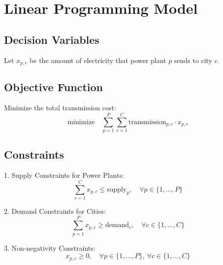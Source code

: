 \documentclass{article}
\begin{document}
\section*{Linear Programming Model}

\subsection*{Decision Variables}
Let \( x_{p,c} \) be the amount of electricity that power plant \( p \) sends to city \( c \).

\subsection*{Objective Function}
Minimize the total transmission cost:
\[
\text{minimize} \quad \sum_{p=1}^{P} \sum_{c=1}^{C} \text{transmission}_{p,c} \cdot x_{p,c}
\]

\subsection*{Constraints}
1. Supply Constraints for Power Plants:
   \[
   \sum_{c=1}^{C} x_{p,c} \leq \text{supply}_{p}, \quad \forall p \in \{1, \ldots, P\}
   \]

2. Demand Constraints for Cities:
   \[
   \sum_{p=1}^{P} x_{p,c} \geq \text{demand}_{c}, \quad \forall c \in \{1, \ldots, C\}
   \]

3. Non-negativity Constraints:
   \[
   x_{p,c} \geq 0, \quad \forall p \in \{1, \ldots, P\}, \ \forall c \in \{1, \ldots, C\}
   \]
\end{document}
